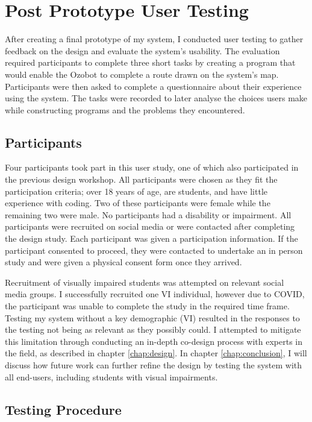 \documentclass[oneside,%
                    author={Malak Hajji},
                    degree={BSc},
                    title={Designing An Accessible Ozobot Programming Platform for Students},
                  subtitle={With Mixed Visual Abilities}]{dissertation}
\begin{document}
\chapter{Post Prototype User Testing}
\label{chap:testing}

After creating a final prototype of my system, I conducted user testing to gather feedback on the design and evaluate the system's usability. The evaluation required participants to complete three short tasks by creating a program that would enable the Ozobot to complete a route drawn on the system's map. Participants were then asked to complete a questionnaire about their experience using the system. The tasks were recorded to later analyse the choices users make while constructing programs and the problems they encountered.

\section{Participants}
Four participants took part in this user study, one of which also participated in the previous design workshop. All participants were chosen as they fit the participation criteria; over 18 years of age, are students, and have little experience with coding. Two of these participants were female while the remaining two were male. No participants had a disability or impairment. All participants were recruited on social media or were contacted after completing the design study. Each participant was given a participation information. If the participant consented to proceed, they were contacted to undertake an in person study and were given a physical consent form once they arrived. 

Recruitment of visually impaired students was attempted on relevant social media groups. I successfully recruited one VI individual, however due to COVID, the participant was unable to complete the study in the required time frame. Testing my system without a key demographic (VI) resulted in the responses to the testing not being as relevant as they possibly could. I attempted to mitigate this limitation through conducting an in-depth co-design process with experts in the field, as described in chapter \ref{chap:design}. In chapter \ref{chap:conclusion}, I will discuss how future work can further refine the design by testing the system with all end-users, including students with visual impairments. 

\section{Testing Procedure}
\end{document}
